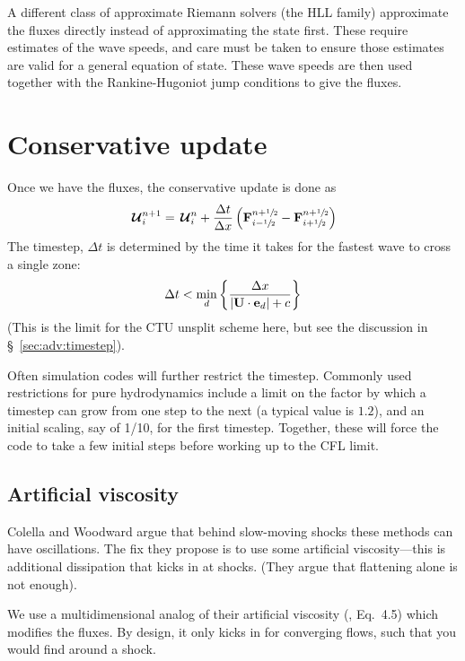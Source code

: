 A different class of approximate Riemann solvers (the HLL family)
approximate the fluxes directly instead of approximating the state
first.  These require estimates of the wave speeds, and care must be
taken to ensure those estimates are valid for a general equation of
state.  These wave speeds are then used together with the
Rankine-Hugoniot jump conditions to give the fluxes.


\section{Conservative update}

Once we have the fluxes, the conservative update is done as
\begin{equation}
{\,\boldsymbol{\mathcal{U}}}^{n+1}_i = {\,\boldsymbol{\mathcal{U}}}^n_i + \frac{\Delta t}{\Delta x} 
   \left ( {\bf F}_{i-{\sfrac{1}{2}}}^{n+{\sfrac{1}{2}}} - {\bf F}_{i+{\sfrac{1}{2}}}^{n+{\sfrac{1}{2}}} \right )
\end{equation}
The timestep, $\Delta t$ is determined by the time it takes for the
fastest wave to cross a single zone:
\begin{equation}
\Delta t < \min_d \left \{ \frac{\Delta x}{|{\bf U} \cdot {\bf e}_d| + c}\right \}
\end{equation}
(This is the limit for the CTU unsplit scheme here, but see the discussion
in \S~\ref{sec:adv:timestep}).

Often simulation codes will further restrict the timestep.  Commonly
used restrictions for pure hydrodynamics include a limit on the factor
by which a timestep can grow from one step to the next (a typical
value is $1.2$), and an initial scaling, say of 1/10, for the first
timestep.  Together, these will force the code to take a few initial
steps before working up to the CFL limit.

\subsection{Artificial viscosity}

Colella and Woodward argue that behind slow-moving shocks these
methods can have oscillations.  The fix they propose is to use some
artificial viscosity---this is additional dissipation that kicks in at
shocks.  (They argue that flattening alone is not enough).

We use a multidimensional analog of their artificial viscosity
(\cite{colellawoodward:1984}, Eq.\ 4.5) which modifies the fluxes.  By
design, it only kicks in for converging flows, such that you would
find around a shock.


